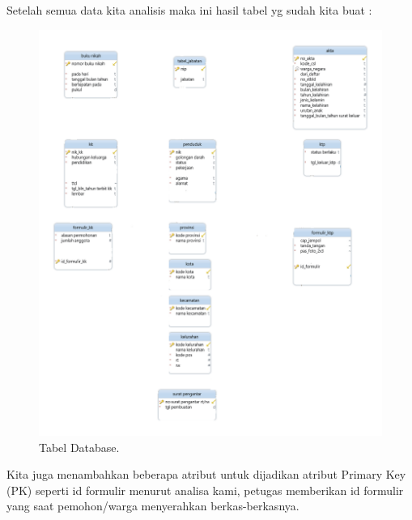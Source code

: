 Setelah semua data kita analisis maka ini hasil tabel yg sudah kita buat :

\begin{figure}[H]
	\centering
	\includegraphics[width=12cm]{figures/0002t.png}
	\caption{Tabel Database.}	
\end{figure}

Kita juga menambahkan beberapa atribut untuk dijadikan atribut Primary Key (PK) seperti id formulir menurut analisa kami, petugas memberikan id formulir yang saat pemohon/warga menyerahkan berkas-berkasnya.